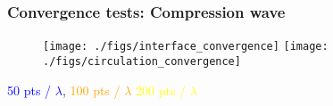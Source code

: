 \begin{frame}\frametitle{Convergence tests: Compression wave}
  \begin{figure}
    \centering
    \hfill%
    \texttt{[image: ./figs/interface\_convergence]}\hfill%
    \texttt{[image: ./figs/circulation\_convergence]}\hfill%
    \hfill%
  \end{figure}
  \begin{center}
    \textcolor{blue}{50 pts / $\lambda$}, \qquad%
    \textcolor{orange}{100 pts / $\lambda$} \qquad%
    \textcolor{yellow}{200 pts / $\lambda$}%
  \end{center}
\end{frame}

